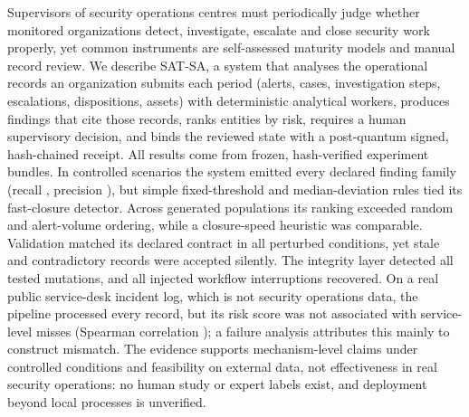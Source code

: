 Supervisors of security operations centres must periodically judge whether monitored
organizations detect, investigate, escalate and close security work properly, yet
common instruments are self-assessed maturity models and manual record review. We
describe SAT-SA, a system that analyses the operational records an organization
submits each period (alerts, cases, investigation steps, escalations, dispositions,
assets) with  deterministic analytical workers, produces findings that
cite those records, ranks entities by risk, requires a human supervisory decision,
and binds the reviewed state with a post-quantum signed, hash-chained receipt. All
results come from frozen, hash-verified experiment bundles. In 
controlled scenarios the system emitted every declared finding family (recall
, precision ), but simple fixed-threshold and
median-deviation rules tied its fast-closure detector. Across 
generated populations its ranking exceeded random and alert-volume ordering, while a
closure-speed heuristic was comparable. Validation matched its declared contract in
all  perturbed conditions, yet stale and contradictory records were
accepted silently. The integrity layer detected all  tested
mutations, and all  injected workflow interruptions recovered. On a real
public service-desk incident log, which is not security operations data, the
pipeline processed every record, but its risk score was not associated with
service-level misses (Spearman correlation ); a failure analysis
attributes this mainly to construct mismatch. The evidence supports mechanism-level
claims under controlled conditions and feasibility on external data, not
effectiveness in real security operations: no human study or expert labels exist, and
deployment beyond local processes is unverified.
